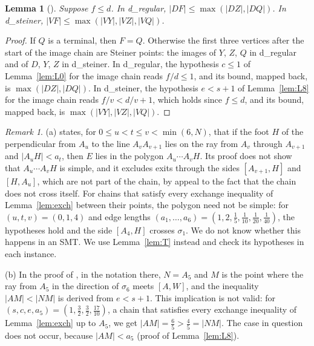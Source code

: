 \documentclass[11pt]{amsart}
\newtheorem{lemma}[theorem]{Lemma}
\theoremstyle{definition}
\theoremstyle{remark}
\newtheorem{remark}[theorem]{Remark}
\numberwithin{equation}{section}
\begin{document}
\begin{lemma}[{\cite[Lemma~28 and Corollary~26]{KHSHGW}}]\label{lem:Y}
Suppose $f\le d$. In d\_regular, $|DF|\le\max(|DZ|,|DQ|)$. In d\_steiner, $|VF|\le\max(|VY|,|VZ|,|VQ|)$.
\end{lemma}

\begin{proof}
If $Q$ is a terminal, then $F=Q$. Otherwise the first three vertices after the start of the image chain are Steiner points: the images of $Y$, $Z$, $Q$ in d\_regular and of $D$, $Y$, $Z$ in d\_steiner. In d\_regular, the hypothesis $c\le1$ of Lemma~\ref{lem:L0} for the image chain reads $f/d\le1$, and its bound, mapped back, is $\max(|DZ|,|DQ|)$. In d\_steiner, the hypothesis $e<s+1$ of Lemma~\ref{lem:L8} for the image chain reads $f/v<d/v+1$, which holds since $f\le d$, and its bound, mapped back, is $\max(|VY|,|VZ|,|VQ|)$.
\end{proof}

\begin{remark}\label{rem:pku}
(a) \cite[Lemma~8]{KHSHGW} states, for $0\le u<t\le v<\min(6,N)$, that if the foot $H$ of the perpendicular from $A_u$ to the line $A_vA_{v+1}$ lies on the ray from $A_v$ through $A_{v+1}$ and $|A_uH|<a_t$, then $E$ lies in the polygon $A_u\cdots A_vH$. Its proof does not show that $A_u\cdots A_vH$ is simple, and it excludes exits through the sides $[A_{v+1},H]$ and $[H,A_u]$, which are not part of the chain, by appeal to the fact that the chain does not cross itself. For chains that satisfy every exchange inequality of Lemma~\ref{lem:exch} between their points, the polygon need not be simple: for $(u,t,v)=(0,1,4)$ and edge lengths $(a_1,\dots,a_6)=(1,2,\frac15,\frac1{10},\frac1{20},\frac1{40})$, the hypotheses hold and the side $[A_4,H]$ crosses $\sigma_1$. We do not know whether this happens in an SMT. We use Lemma~\ref{lem:T} instead and check its hypotheses in each instance.

(b) In the proof of \cite[Lemma~36]{KHSHGW}, in the notation there, $N=A_5$ and $M$ is the point where the ray from $A_5$ in the direction of $\sigma_6$ meets $[A,W]$, and the inequality $|AM|<|NM|$ is derived from $e<s+1$. This implication is not valid: for $(s,c,e,a_5)=(1,\frac32,\frac32,\frac{17}{10})$, a chain that satisfies every exchange inequality of Lemma~\ref{lem:exch} up to $A_5$, we get $|AM|=\frac65>\frac45=|NM|$. The case in question does not occur, because $|AM|<a_5$ (proof of Lemma~\ref{lem:L8}).
\end{remark}
\end{document}
